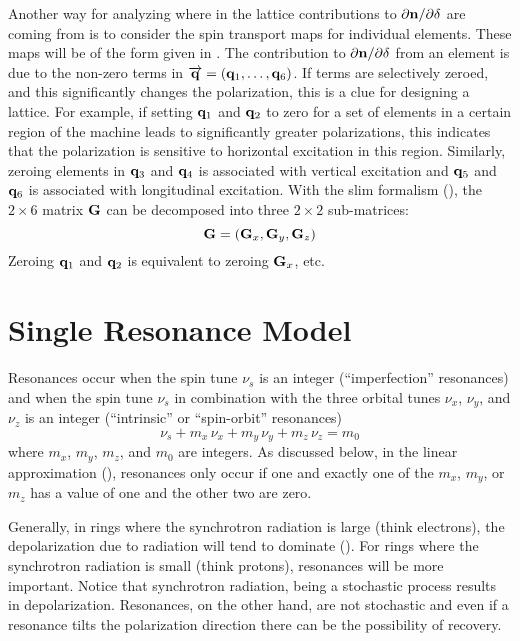 Another way for analyzing where in the lattice contributions to $\partial{\bf n}/\partial\delta$ are
coming from is to consider the spin transport maps for individual elements. These maps will be of
the form given in . The contribution to $\partial{\bf n}/\partial\delta$ from an element is
due to the non-zero terms in $\overrightarrow{{\bf q}} = ({\bf q}_1, \ldots, {\bf q}_6)$. If terms are selectively
zeroed, and this significantly changes the polarization, this is a clue for designing a lattice. For
example, if setting ${\bf q}_1$ and ${\bf q}_2$ to zero for a set of elements in a certain region of the
machine leads to significantly greater polarizations, this indicates that the polarization is
sensitive to horizontal excitation in this region. Similarly, zeroing elements in ${\bf q}_3$ and
${\bf q}_4$ is associated with vertical excitation and ${\bf q}_5$ and ${\bf q}_6$ is associated with
longitudinal excitation. With the slim formalism (), the $2\times6$ matrix
${\bf G}$ can be decomposed into three $2\times2$ sub-matrices:
\begin{equation}
  {\bf G} = \left( {\bf G}_x, {\bf G}_y, {\bf G}_z \right)
\end{equation}
Zeroing ${\bf q}_1$ and ${\bf q}_2$ is equivalent to zeroing ${\bf G}_x$, etc.

\section{Single Resonance Model}
\label{s:spin.res}

Resonances occur when the spin tune $\nu_s$ is an integer (``imperfection'' resonances) and when the spin
tune $\nu_s$ in combination with the three orbital tunes $\nu_x$, $\nu_y$, and $\nu_z$ is an integer
(``intrinsic'' or ``spin-orbit'' resonances)
\begin{equation}
  \nu_s + m_x \, \nu_x + m_y \, \nu_y + m_z \, \nu_z = m_0
\end{equation}
where $m_x$, $m_y$, $m_z$, and $m_0$ are integers. As discussed below, 
in the linear approximation (),
resonances only occur if one and exactly one of the $m_x$, $m_y$, or $m_z$ has a value of one and
the other two are zero.

Generally, in rings where the synchrotron radiation is large (think electrons), the depolarization
due to radiation will tend to dominate (). For rings where the synchrotron radiation is
small (think protons), resonances will be more important. Notice that synchrotron radiation, being a
stochastic process results in depolarization. Resonances, on the other hand, are not stochastic and
even if a resonance tilts the polarization direction there can be the possibility of recovery.

